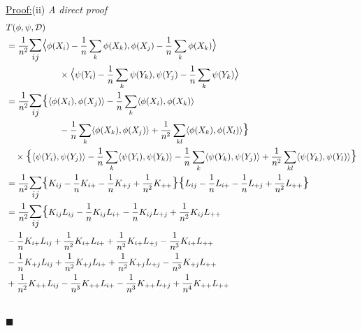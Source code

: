 \documentclass[12pt]{article}
\newenvironment{claimproof}[1]{\par\noindent\underline{Proof:}\space#1}{\hfill $\blacksquare$}
\numberwithin{claim}{section}
\numberwithin{lemma}{section}
\numberwithin{theorem}{section}
\begin{document}
\begin{claimproof} (ii) \emph{A direct proof}
\begin{align*}
& T(\phi, \psi, \mathcal{D})\\
 &=\frac{1}{n^2} \mathlarger{\mathlarger{\sum_{ij}}} \mathlarger{\mathlarger{\langle}} \phi(X_i) - \frac{1}{n}\sum_k \phi(X_k), \phi(X_j) - \frac{1}{n}\sum_k \phi(X_k) \mathlarger{\mathlarger{\rangle}} \\&\quad\quad\quad\quad\quad\quad \times\mathlarger{\mathlarger{\langle}} \psi(Y_i) - \frac{1}{n}\sum_k \psi(Y_k), \psi(Y_j) - \frac{1}{n}\sum_k \psi(Y_k) \mathlarger{\mathlarger{\rangle}} \\
& = \frac{1}{n^2} \mathlarger{\mathlarger{\sum_{ij}}} \mathlarger{\mathlarger{\{}} \langle \phi(X_i),\phi(X_j)\rangle - \frac{1}{n} \sum_k \langle \phi(X_i),\phi(X_k)\rangle\\&\quad\quad\quad\quad\quad\quad - \frac{1}{n} \sum_k \langle \phi(X_k),\phi(X_j)\rangle +\frac{1}{n^2} \sum_{kl} \langle \phi(X_k),\phi(X_l)\rangle   \mathlarger{\mathlarger{\}}} \\
& \quad \times \mathlarger{\mathlarger{\{}} \langle \psi(Y_i),\psi(Y_j)\rangle - \frac{1}{n} \sum_k \langle \psi(Y_i),\psi(Y_k)\rangle - \frac{1}{n} \sum_k \langle \psi(Y_k),\psi(Y_j)\rangle +\frac{1}{n^2} \sum_{kl} \langle \psi(Y_k),\psi(Y_l)\rangle   \mathlarger{\mathlarger{\}}} \\
& = \frac{1}{n^2} \mathlarger{\mathlarger{\sum_{ij}}} \mathlarger{\mathlarger{\{}} K_{ij} - \frac{1}{n} K_{i+} - \frac{1}{n}K_{+j} +\frac{1}{n^2} K_{++}   \mathlarger{\mathlarger{\}}} \mathlarger{\mathlarger{\{}} L_{ij} - \frac{1}{n} L_{i+} - \frac{1}{n}L_{+j} +\frac{1}{n^2} L_{++}   \mathlarger{\mathlarger{\}}} \\ 
& = \frac{1}{n^2} \mathlarger{\mathlarger{\sum_{ij}}} \mathlarger{\mathlarger{\{}} K_{ij} L_{ij} - \frac{1}{n} K_{ij} L_{i+} - \frac{1}{n}K_{ij} L_{+j} +\frac{1}{n^2} K_{ij} L_{++}  \\
& - \frac{1}{n} K_{i+}L_{ij} + \frac{1}{n^2} K_{i+}L_{i+} + \frac{1}{n^2}K_{i+}L_{+j} - \frac{1}{n^3} K_{i+}L_{++}\\
& -  \frac{1}{n}K_{+j}L_{ij} + \frac{1}{n^2}K_{+j} L_{i+} + \frac{1}{n^2}K_{+j} L_{+j} -\frac{1}{n^3} K_{+j} L_{++}\\
& + \frac{1}{n^2} K_{++}L_{ij} - \frac{1}{n^3}K_{++} L_{i+} - \frac{1}{n^3}K_{++}L_{+j} +\frac{1}{n^4}K_{++} L_{++}\\ \\
\end{align*}

\end{claimproof}
\end{document}
